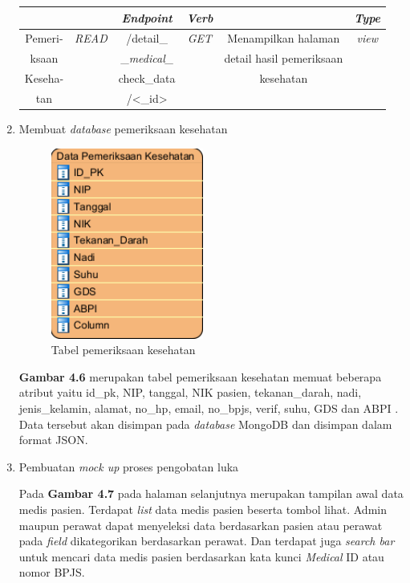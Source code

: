 \begin{enumerate}
\begin{table}[H]
\begin{tabular}{|c|c|c|c|c|c|}
			& & \textbf{\emph{Endpoint}} & \textbf{\emph{Verb}} & & \textbf{\emph{Type}} \\
			\hline
			
			Pemeri-& 
			\emph{READ} &
			/detail\_ &
			\emph{GET} &
			Menampilkan halaman &
			\emph{view}\\
			
			ksaan& 
			&
			\_\emph{medical\_}&
			&
			detail hasil pemeriksaan &
			\\
			
			Keseha-& 
			&
			check\_data&
			&
			kesehatan &
			\\
			
			tan& 
			&
			/<\_id>&
			&
			&
			\\
			\hline				
			
		\end{tabular}
	\end{table}
	
	\item Membuat \emph{database} pemeriksaan kesehatan
	
	\begin{figure}[H]
		\centering
		\includegraphics[width=5cm]{gambar/database_data_pemeriksaan_kesehatan.png}
		\caption{Tabel pemeriksaan kesehatan}
		\label{Gambar:pengelolaanantrian2}
	\end{figure}

	\textbf{Gambar 4.6} merupakan tabel pemeriksaan kesehatan memuat beberapa atribut yaitu id\_pk, NIP, tanggal, NIK pasien, tekanan\_darah, nadi, jenis\_kelamin, alamat, no\_hp, email, no\_bpjs, verif, suhu, GDS dan ABPI . Data tersebut akan disimpan pada \emph{database} MongoDB dan disimpan dalam format JSON.
	
	\break
	\item Pembuatan \emph{mock up} proses pengobatan luka
	
	Pada \textbf{Gambar 4.7} pada halaman selanjutnya merupakan tampilan awal data medis pasien. Terdapat \emph{list} data medis pasien beserta tombol lihat. Admin maupun perawat dapat menyeleksi data berdasarkan pasien atau perawat pada \emph{field} dikategorikan berdasarkan perawat. Dan terdapat juga \emph{search bar} untuk mencari data medis pasien berdasarkan kata kunci \emph{Medical} ID atau nomor BPJS.
	

\end{enumerate}
